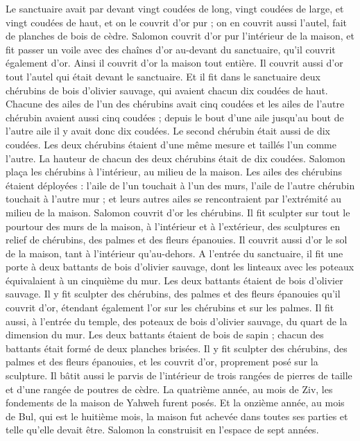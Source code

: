 \begin{multicols}{2}
Le sanctuaire avait par devant vingt coudées de long, vingt coudées de large, et vingt coudées de haut, et on le couvrit d’or pur ; on en couvrit aussi l'autel, fait de planches de bois de cèdre.
Salomon couvrit d’or pur l’intérieur de la maison, et fit passer un voile avec des chaînes d'or au-devant du sanctuaire, qu’il couvrit également d'or.
Ainsi il couvrit d'or la maison tout entière. Il couvrit aussi d'or tout l'autel qui était devant le sanctuaire.
Et il fit dans le sanctuaire deux chérubins de bois d'olivier sauvage, qui avaient chacun dix coudées de haut.
Chacune des ailes de l'un des chérubins avait cinq coudées et les ailes de l’autre chérubin avaient aussi cinq coudées ; depuis le bout d'une aile jusqu'au bout de l'autre aile il y avait donc dix coudées.
Le second chérubin était aussi de dix coudées. Les deux chérubins étaient d'une même mesure et taillés l'un comme l'autre.
La hauteur de chacun des deux chérubins était de dix coudées.
Salomon plaça les chérubins à l’intérieur, au milieu de la maison. Les ailes des chérubins étaient déployées : l'aile de l'un touchait à l’un des murs, l'aile de l'autre chérubin touchait à l'autre mur ; et leurs autres ailes se rencontraient par l’extrémité au milieu de la maison.
Salomon couvrit d'or les chérubins.
Il fit sculpter sur tout le pourtour des murs de la maison, à l’intérieur et à l’extérieur, des sculptures en relief de chérubins, des palmes et des fleurs épanouies.
Il couvrit aussi d'or le sol de la maison, tant à l’intérieur qu’au-dehors.
A l'entrée du sanctuaire, il fit une porte à deux battants de bois d'olivier sauvage, dont les linteaux avec les poteaux équivalaient à un cinquième du mur.
Les deux battants étaient de bois d'olivier sauvage. Il y fit sculpter des chérubins, des palmes et des fleurs épanouies qu’il couvrit d'or, étendant également l'or sur les chérubins et sur les palmes.
Il fit aussi, à l'entrée du temple, des poteaux de bois d'olivier sauvage, du quart de la dimension du mur.
Les deux battants étaient de bois de sapin ; chacun des battants était formé de deux planches brisées.
Il y fit sculpter des chérubins, des palmes et des fleurs épanouies, et les couvrit d'or, proprement posé sur la sculpture.
Il bâtit aussi le parvis de l’intérieur de trois rangées de pierres de taille et d'une rangée de poutres de cèdre.
La quatrième année, au mois de Ziv, les fondements de la maison de Yahweh furent posés.
Et la onzième année, au mois de Bul, qui est le huitième mois, la maison fut achevée dans toutes ses parties et telle qu’elle devait être. Salomon la construisit en l’espace de sept années.

\end{multicols}
